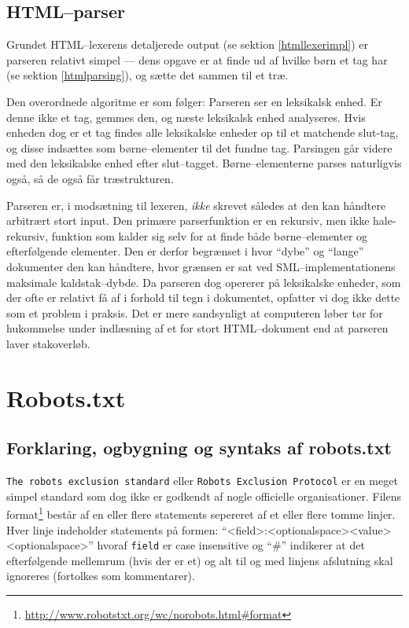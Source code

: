 \documentclass[a4paper,oneside,article]{memoir}
\begin{document}
\subsection{HTML--parser}

Grundet HTML--lexerens detaljerede output (se sektion
\ref{htmllexerimpl}) er parseren relativt simpel --- dens opgave er at
finde ud af hvilke børn et tag har (se sektion \ref{htmlparsing}), og
sætte det sammen til et træ.

Den overordnede algoritme er som følger: Parseren ser en leksikalsk
enhed. Er denne ikke et tag, gemmes den, og næste leksikalsk enhed
analyseres. Hvis enheden dog er et tag findes alle leksikalske enheder
op til et matchende slut-tag, og disse indsættes som børne--elementer
til det fundne tag. Parsingen går videre med den leksikalske enhed
efter slut--tagget. Børne--elementerne parses naturligvis også, så de
også får træstrukturen.

Parseren er, i modsætning til lexeren, \textit{ikke} skrevet således
at den kan håndtere arbitrært stort input. Den primære parserfunktion
er en rekursiv, men ikke hale-rekursiv, funktion som kalder sig selv
for at finde både børne--elementer og efterfølgende elementer. Den er
derfor begrænset i hvor ``dybe'' og ``lange'' dokumenter den kan
håndtere, hvor grænsen er sat ved SML--implementationens maksimale
kaldstak--dybde. Da parseren dog opererer på leksikalske enheder, som
der ofte er relativt få af i forhold til tegn i dokumentet, opfatter
vi dog ikke dette som et problem i praksis. Det er mere sandsynligt at
computeren løber tør for hukommelse under indlæsning af et for stort
HTML--dokument end at parseren laver stakoverløb.

\section{Robots.txt}
\label{Robots} 


\subsection{Forklaring, ogbygning og syntaks af robots.txt}

\texttt{The robots exclusion standard} eller \texttt{Robots Exclusion Protocol}
er en meget simpel standard som dog ikke er godkendt af nogle officielle
organisationer. 
Filens format\footnote{\url{http://www.robotstxt.org/wc/norobots.html#format}}
består af en eller flere statements sepereret af et eller flere tomme linjer.
Hver linje indeholder statements på formen:
``<field>:<optionalspace><value><optionalspace>'' hvoraf \texttt{field} er case
insensitive og ``#'' indikerer at det efterfølgende mellemrum (hvis der er et)
og alt til og med linjens afslutning skal ignoreres (fortolkes som kommentarer).
\end{document}

